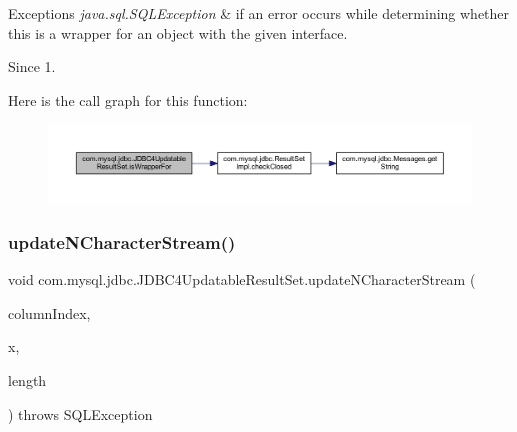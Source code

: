\begin{DoxyExceptions}{Exceptions}
{\em java.\+sql.\+S\+Q\+L\+Exception} & if an error occurs while determining whether this is a wrapper for an object with the given interface. \\
\hline
\end{DoxyExceptions}
\begin{DoxySince}{Since}
1. 
\end{DoxySince}
Here is the call graph for this function\+:
\nopagebreak
\begin{figure}[H]
\begin{center}
\leavevmode
\includegraphics[width=350pt]{classcom_1_1mysql_1_1jdbc_1_1_j_d_b_c4_updatable_result_set_a550bdf2d1e3a3f3a6d032c50601c0c89_cgraph}
\end{center}
\end{figure}
\mbox{\label{classcom_1_1mysql_1_1jdbc_1_1_j_d_b_c4_updatable_result_set_a37b65317e041f183ae3cb6b643d1fd27}} 
\subsubsection{\texorpdfstring{update\+N\+Character\+Stream()}{updateNCharacterStream()}\hspace{0.1cm}{\footnotesize\ttfamily [1/2]}}
{\footnotesize\ttfamily void com.\+mysql.\+jdbc.\+J\+D\+B\+C4\+Updatable\+Result\+Set.\+update\+N\+Character\+Stream (\begin{DoxyParamCaption}\item[{int}]{column\+Index,  }\item[{java.\+io.\+Reader}]{x,  }\item[{int}]{length }\end{DoxyParamCaption}) throws S\+Q\+L\+Exception}

